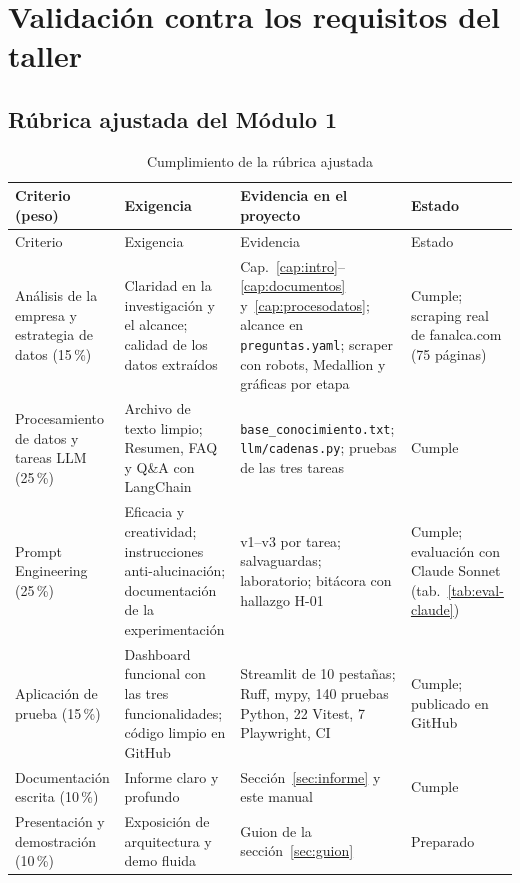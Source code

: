 \chapter{Validación contra los requisitos del taller}\label{cap:validacion}

\section{Rúbrica ajustada del Módulo 1}
\begin{longtable}{@{}P{3.2cm}P{4.6cm}P{5.0cm}P{2.2cm}@{}}
\caption{Cumplimiento de la rúbrica ajustada}\label{tab:rubrica}\\\toprule
Criterio (peso) & Exigencia & Evidencia en el proyecto & Estado\\\midrule\endfirsthead
\toprule Criterio & Exigencia & Evidencia & Estado\\\midrule\endhead
Análisis de la empresa y estrategia de datos (15\,\%) & Claridad en la investigación y el alcance; calidad de
los datos extraídos & Cap.~\ref{cap:intro}--\ref{cap:documentos} y~\ref{cap:procesodatos}; alcance en
\texttt{preguntas.yaml}; scraper con robots, Medallion y gráficas por etapa & Cumple; scraping real de fanalca.com (75 páginas)\\
Procesamiento de datos y tareas LLM (25\,\%) & Archivo de texto limpio; Resumen, FAQ y Q\&A con LangChain &
\texttt{base\_conocimiento.txt}; \texttt{llm/cadenas.py}; pruebas de las tres tareas & Cumple\\
Prompt Engineering (25\,\%) & Eficacia y creatividad; instrucciones anti-alucinación; documentación de la
experimentación & v1--v3 por tarea; salvaguardas; laboratorio; bitácora con hallazgo H-01 & Cumple;
evaluación con Claude Sonnet (tab.~\ref{tab:eval-claude})\\
Aplicación de prueba (15\,\%) & Dashboard funcional con las tres funcionalidades; código limpio en GitHub &
Streamlit de 10 pestañas; Ruff, mypy, 140 pruebas Python, 22 Vitest, 7 Playwright, CI & Cumple; publicado en GitHub\\
Documentación escrita (10\,\%) & Informe claro y profundo & Sección~\ref{sec:informe} y este manual & Cumple\\
Presentación y demostración (10\,\%) & Exposición de arquitectura y demo fluida & Guion de la
sección~\ref{sec:guion} & Preparado\\\bottomrule
\end{longtable}

